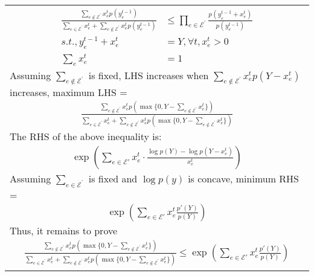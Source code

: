 \documentclass{article}
\begin{document}
\begin{tabular}{l}
\begin{equation*}
\begin{aligned}
\frac{ \sum_{e \notin \mathcal{E}^{\prime}} x_{e}^{t} p(y_e^{t-1})}{\sum_{e \in \mathcal{E}^{\prime}}  x_{e}^{t} +\sum_{e \notin \mathcal{E}^{\prime}} x_{e}^{t} p(y_e^{t-1})} &\leq  \prod_{ e \in \mathcal{E}^{\prime}} \frac{p(y_e^{t-1} + x_e^t)}{p(y_e^{t-1})}
\\
s.t., y_e^{t-1} + x_e^t  &= Y,  \forall t, x_e^{t} > 0
\\
\sum_{e } x_e^t &= 1
\end{aligned}
\end{equation*}
Assuming $\sum_{e \notin \mathcal{E}^{\prime}} $ is fixed, LHS increases when  $\sum_{e \notin \mathcal{E}^{\prime}} x_{e}^{t} p(Y-x_e^t)$ increases, maximum LHS =
\begin{equation*}
    \begin{aligned}
        \frac{ \sum_{e \notin \mathcal{E}^{\prime}} x_{e}^{t} p(\max\{0,Y-\sum_{e \notin \mathcal{E}^{\prime}}x_e^t\})}{\sum_{e \in \mathcal{E}^{\prime}}  x_{e}^{t} + 
 \sum_{e \notin \mathcal{E}^{\prime}} x_{e}^{t} p(\max\{0,Y-\sum_{e \notin \mathcal{E}^{\prime}}x_e^t\})
}
    \end{aligned}
\end{equation*}
The RHS of the above inequality is: 
\begin{equation*}
    \begin{aligned}
        \exp\left(\sum_{e\in\mathcal{E'}}x_e^t\cdot\frac{\log p(Y)-\log p(Y-x_e^t)}{x_e^t}\right)
    \end{aligned}
\end{equation*}
Assuming $\sum_{e \in \mathcal{E}^{\prime}} $ is fixed and $\log p(y)$ is concave, minimum RHS = 
\begin{equation*}
    \begin{aligned}
        \exp\left(\sum_{e\in\mathcal{E'}}x_e^t\frac{p'(Y)}{p(Y)}\right)
    \end{aligned}
\end{equation*}
Thus, it remains to prove 
\begin{equation*}
   \begin{aligned}
    \frac{ \sum_{e \notin \mathcal{E}^{\prime}} x_{e}^{t} p(\max\{0,Y-\sum_{e \notin \mathcal{E}^{\prime}}x_e^t\})}{\sum_{e \in \mathcal{E}^{\prime}}  x_{e}^{t} + 
 \sum_{e \notin \mathcal{E}^{\prime}} x_{e}^{t} p(\max\{0,Y-\sum_{e \notin \mathcal{E}^{\prime}}x_e^t\})
} \leq \exp\left(\sum_{e\in\mathcal{E'}}x_e^t\frac{p'(Y)}{p(Y)}\right)
   \end{aligned}    
\end{equation*}

\end{tabular}
\end{document}
